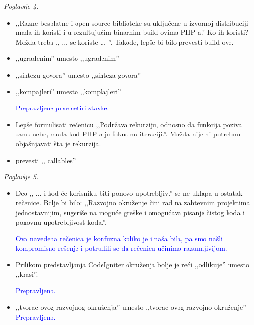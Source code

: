\documentclass[a4paper]{report}
\newcommand{\odgovor}[1]{\textcolor{blue}{#1}}
\begin{document}
\textit{Poglavlje 4.}
\begin{itemize}
\item ‚‚Razne besplatne i open-source biblioteke su uključene u izvornoj distribuciji mada ih koristi i u rezultujućim binarnim build-ovima PHP-a.'' Ko ih koristi? Možda treba ,, ... se koriste ... ''. Takođe, lepše bi bilo prevesti build-ove.
\item ‚‚ugrađenim'' umesto ‚‚ugradenim''
\item ‚‚sintezu govora'' umesto ‚‚sinteza govora''
\item ‚‚kompajleri'' umesto ‚‚komplajleri''

\odgovor{Prepravljene prve cetiri stavke.}

\item Lepše formulisati rečenicu ‚‚Podržava rekurziju, odnosno da funkcija poziva samu sebe, mada kod PHP-a je fokus na iteraciji.''. Možda nije ni potrebno objašnjavati šta je rekurzija.
\item prevesti ,, callables''\\
\end{itemize}

\textit{Poglavlje 5.}
\begin{itemize}
\item Deo ,, ... i kod će korisniku biti ponovo upotrebljiv.'' se ne uklapa u ostatak rečenice. Bolje bi bilo: ,,Razvojno okruženje čini rad na zahtevnim projektima jednostavnijim, sugeriše na moguće greške i omogućava pisanje čistog koda i ponovnu upotrebljivost koda.''.

\odgovor{Ova navedena rečenica je konfuzna koliko je i naša bila, pa smo našli kompromisno rešenje i potrudili se da rečenicu učinimo razumljivijom.}

\item Prilikom predstavljanja CodeIgniter okruženja bolje je reći ‚‚odlikuje'' umesto ‚‚krasi''.

\odgovor{Prepravljeno.}

\item ‚‚tvorac ovog razvojnog okruženja'' umesto ‚‚tvorac ovog razvojno okruženje''\\

\odgovor{Prepravljeno.}
\end{itemize}
\end{document}

